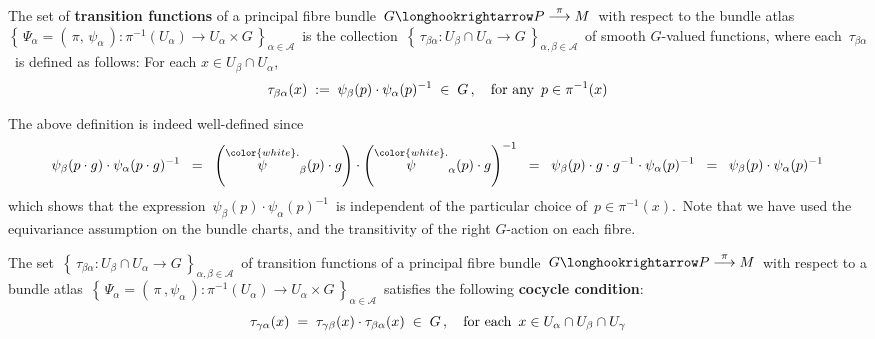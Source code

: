 
\vskip 0.5cm
\begin{definition}
\mbox{}
\vskip 0.2cm
\noindent
The set of \textbf{transition functions} of a principal fibre bundle
\,$G \longhookrightarrow P \overset{\pi}{\longrightarrow} M$\,
with respect to the bundle atlas
\,$\left\{\,\Psi_{\alpha} = (\,\pi,\,\psi_{\alpha}\,) : \pi^{-1}(U_{\alpha}) \longrightarrow U_{\alpha} \times G\,\right\}_{\alpha\in\mathcal{A}}$\,
is the collection
\,$\left\{\,\tau_{\beta\alpha} : U_{\beta} \cap U_{\alpha} \longrightarrow G\,\right\}_{\alpha,\beta\in\mathcal{A}}$\,
of smooth $G$-valued functions, where each
\,$\tau_{\beta\alpha}$\,
is defined as follows:
For each $x \in U_{\beta} \cap U_{\alpha}$,
\begin{equation*}
\tau_{\beta\alpha}(x)
\; := \;
	\psi_{\beta}(p) \cdot \psi_{\alpha}(p)^{-1}
\; \in \;
	G\,,
\quad
\textnormal{for any \,$p \in \pi^{-1}(x)$}
\end{equation*}
\end{definition}


\begin{remark}
\mbox{}
\vskip 0.2cm
\noindent
The above definition is indeed well-defined since
\begin{equation*}
\psi_{\beta}(p \cdot g) \cdot \psi_{\alpha}(p \cdot g)^{-1}
\;\; = \;\;
	\left(\overset{{\color{white}.}}{\psi}_{\beta}(p)\cdot g\right) \cdot \left(\overset{{\color{white}.}}{\psi}_{\alpha}(p)\cdot g\right)^{-1}
\;\; = \;\;
	\psi_{\beta}(p) \cdot g \cdot g^{-1} \cdot \psi_{\alpha}(p)^{-1}
\;\; = \;\;
	\psi_{\beta}(p) \cdot \psi_{\alpha}(p)^{-1}
\end{equation*}
which shows that the expression
\,$\psi_{\beta}(p) \cdot \psi_{\alpha}(p)^{-1}$\,
is independent of the particular choice of \,$p \in \pi^{-1}(x)$.\,
Note that we have used the equivariance assumption on the bundle charts,
and the transitivity of the right $G$-action on each fibre.
\end{remark}


\vskip 0.5cm
\begin{proposition}
\mbox{}
\vskip 0.2cm
\noindent
The set
\,$\left\{\,\tau_{\beta\alpha} : U_{\beta} \cap U_{\alpha} \longrightarrow G\,\right\}_{\alpha,\beta\in\mathcal{A}}$\,
of transition functions of a principal fibre bundle
\,$G \longhookrightarrow P \overset{\pi}{\longrightarrow} M$\,
with respect to a bundle atlas
\,$\left\{\,\Psi_{\alpha} = (\,\pi\,,\psi_{\alpha}\,) : \pi^{-1}(U_{\alpha}) \longrightarrow U_{\alpha} \times G\,\right\}_{\alpha\in\mathcal{A}}$\,
satisfies the following \textbf{cocycle condition}:
\begin{equation*}
\tau_{\gamma\alpha}(x) \; = \; \tau_{\gamma\beta}(x) \cdot \tau_{\beta\alpha}(x) \; \in \; G\,,
\quad
\textnormal{for each \,$x \in U_{\alpha} \cap U_{\beta} \cap U_{\gamma}$}
\end{equation*}
\end{proposition}


